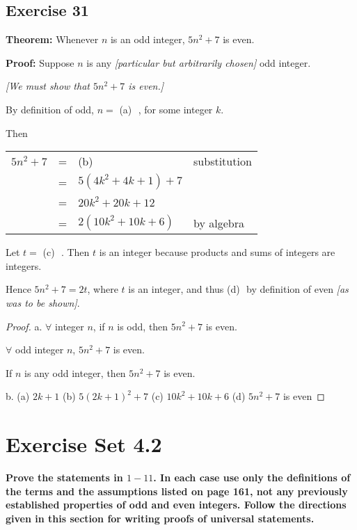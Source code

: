 \documentclass[14pt]{extarticle}
\newcommand{\fbl}{\underline{\hspace{1cm}}\,\,}
\newcommand{\fa}{\forall}
\begin{document}
\subsection{Exercise 31}
{\bf Theorem:} Whenever $n$ is an odd integer, $5n^2 + 7$ is even.

{\bf Proof:} Suppose $n$ is any {\it [particular but arbitrarily chosen]} odd integer. 

{\it [We must show that $5n^2 + 7$ is even.]}

By definition of odd, $n = $ {\color{cyan}(a)} \fbl, for some integer $k$. 

Then

\begin{center}
\begin{tabular}{rcll}
$5n^2 + 7$ & = & {\color{cyan} (b)} \fbl & \color{cyan} substitution \\
& = & $5(4k^2 + 4k + 1) + 7$ & \\
& = & $20k^2 + 20k + 12$ & \\
& = & $2(10k^2 + 10k + 6)$ & \color{cyan} by algebra \\
\end{tabular}
\end{center}

Let $t = $ {\color{cyan} (c)} \fbl. Then $t$ is an integer because products and sums of integers are integers. 

Hence $5n^2 + 7 = 2t$, where $t$ is an integer, and thus {\color{cyan}(d)} \fbl by definition of even {\it [as was to be shown]}.

\begin{proof}
a. $\fa$ integer $n$, if $n$ is odd, then $5n^2+7$ is even.

$\fa$ odd integer $n$, $5n^2+7$ is even.

If $n$ is any odd integer, then $5n^2+7$ is even.

b. (a) $2k+1$ (b) $5(2k+1)^2 + 7$ (c) $10k^2 + 10k + 6$ (d) $5n^2+7$ is even
\end{proof}

\section{Exercise Set 4.2}

{\bf \color{cyan} Prove the statements in $1-11$. In each case use only the definitions of the terms and the assumptions listed on page 161, not any previously established properties of odd and even integers. Follow the directions given in this section for writing proofs of universal statements.}
\end{document}
